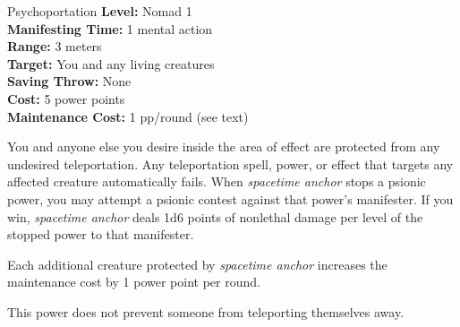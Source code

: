 {Psychoportation}
{
	\textbf{Level:}
	Nomad 1\\
	\textbf{Manifesting Time:}
	1 mental action\\
	\textbf{Range:}
	3 meters\\
	\textbf{Target:}
	You and any living creatures\\
	\textbf{Saving Throw:}
	None\\
	\textbf{Cost:}
	5 power points\\
	\textbf{Maintenance Cost:}
	1 pp/round (see text)\\
}
{
	You and anyone else you desire inside the area of effect are protected from any undesired teleportation. Any teleportation spell, power, or effect that targets any affected creature automatically fails. When \emph{spacetime anchor} stops a psionic power, you may attempt a psionic contest against that power's manifester. If you win, \emph{spacetime anchor} deals 1d6 points of nonlethal damage per level of the stopped power to that manifester.

	Each additional creature protected by \emph{spacetime anchor} increases the maintenance cost by 1 power point per round.

	This power does not prevent someone from teleporting themselves away.
}